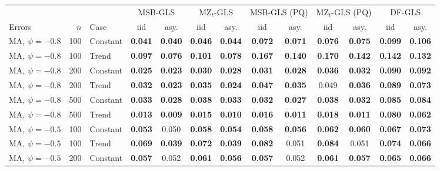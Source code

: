 \begin{tabular}{lrlcccccccccc}
\toprule
& & & \multicolumn{2}{c}{MSB-GLS} & \multicolumn{2}{c}{MZ$_t$-GLS} & \multicolumn{2}{c}{MSB-GLS (PQ)} & \multicolumn{2}{c}{MZ$_t$-GLS (PQ)} & \multicolumn{2}{c}{DF-GLS}\\
\cmidrule(lr){4-5}\cmidrule(lr){6-7}\cmidrule(lr){8-9}\cmidrule(lr){10-11}\cmidrule(lr){12-13}
Errors & $n$ & Case & iid & asy. & iid & asy. & iid & asy. & iid & asy. & iid & asy.\\
\midrule
MA, $\psi = -0.8$ & 100 & Constant & \textbf{0.041} & \textbf{0.040} & \textbf{0.046} & \textbf{0.044} & \textbf{0.072} & \textbf{0.071} & \textbf{0.076} & \textbf{0.075} & \textbf{0.099} & \textbf{0.106} \\
MA, $\psi = -0.8$ & 100 & Trend & \textbf{0.097} & \textbf{0.076} & \textbf{0.101} & \textbf{0.078} & \textbf{0.167} & \textbf{0.140} & \textbf{0.170} & \textbf{0.142} & \textbf{0.142} & \textbf{0.132} \\
MA, $\psi = -0.8$ & 200 & Constant & \textbf{0.025} & \textbf{0.023} & \textbf{0.030} & \textbf{0.028} & \textbf{0.031} & \textbf{0.028} & \textbf{0.036} & \textbf{0.032} & \textbf{0.090} & \textbf{0.092} \\
MA, $\psi = -0.8$ & 200 & Trend & \textbf{0.032} & \textbf{0.023} & \textbf{0.035} & \textbf{0.024} & \textbf{0.047} & \textbf{0.035} & 0.049 & \textbf{0.036} & \textbf{0.089} & \textbf{0.073} \\
MA, $\psi = -0.8$ & 500 & Constant & \textbf{0.033} & \textbf{0.028} & \textbf{0.038} & \textbf{0.033} & \textbf{0.032} & \textbf{0.027} & \textbf{0.038} & \textbf{0.032} & \textbf{0.085} & \textbf{0.084} \\
MA, $\psi = -0.8$ & 500 & Trend & \textbf{0.013} & \textbf{0.009} & \textbf{0.015} & \textbf{0.010} & \textbf{0.016} & \textbf{0.011} & \textbf{0.018} & \textbf{0.011} & \textbf{0.080} & \textbf{0.062} \\
\addlinespace
MA, $\psi = -0.5$ & 100 & Constant & \textbf{0.053} & 0.050 & \textbf{0.058} & \textbf{0.054} & \textbf{0.058} & \textbf{0.056} & \textbf{0.062} & \textbf{0.060} & \textbf{0.067} & \textbf{0.073} \\
MA, $\psi = -0.5$ & 100 & Trend & \textbf{0.069} & \textbf{0.039} & \textbf{0.072} & \textbf{0.039} & \textbf{0.082} & 0.051 & \textbf{0.084} & 0.051 & \textbf{0.074} & \textbf{0.066} \\
MA, $\psi = -0.5$ & 200 & Constant & \textbf{0.057} & 0.052 & \textbf{0.061} & \textbf{0.056} & \textbf{0.057} & 0.052 & \textbf{0.061} & \textbf{0.057} & \textbf{0.065} & \textbf{0.066} \\

\end{tabular}
